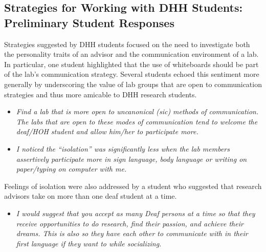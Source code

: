 \documentclass[11.5pt]{sig-alternate} %
\begin{document}
\begin{large}
\subsection*{Strategies for Working with DHH Students: Preliminary Student Responses} 

Strategies suggested by DHH students focused on the need to investigate both the personality traits of an advisor and the communication environment of a lab. In particular, one student highlighted that the use of whiteboards should be part of the lab’s communication strategy. Several students echoed this sentiment more generally by underscoring the value of lab groups that are open to communication strategies and thus more amicable to DHH research students.
\begin{itemize}
    \item \textit{Find a lab that is more open to uncanonical (sic) methods of communication. The labs that are open to these modes of communication tend to welcome the deaf/HOH student and allow him/her to participate more.}
    \item \textit{I noticed the “isolation” was significantly less when the lab members assertively participate more in sign language, body language or writing on paper/typing on computer with me.}
\end{itemize}

Feelings of isolation were also addressed by a student who suggested that research advisors take on more than one deaf student at a time.
\begin{itemize}
    \item \textit{I would suggest that you accept as many Deaf persons at a time so that they receive opportunities to do research, find their passion, and achieve their dreams. This is also so they have each other to communicate with in their first language if they want to while socializing.}
\end{itemize}


\end{large}
\end{document}
